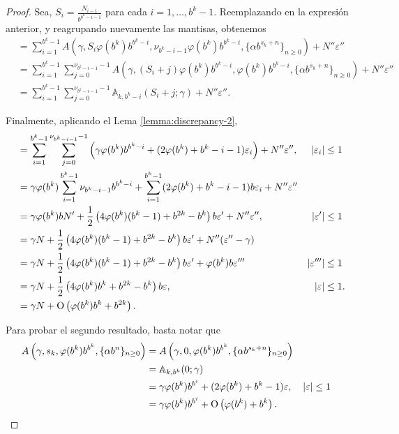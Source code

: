 \begin{proof}
Sea, $S_i = \frac{N_{i-1}}{b^{b^k - i - 1}}$ para cada $i = 1, \dots, b^k - 1$.
Reemplazando en la expresión anterior, y reagrupando nuevamente las mantisas,
obtenemos
\begin{align*}
	&= \sum_{i=1}^{b^k-1} A\left(\gamma, S_i\varphi(b^k)b^{b^k-i},
		\nu_{b^k-i-1}\varphi(b^k)b^{b^k-i}, \lbrace \alpha b^{s_k+n}
		\rbrace_{n\geq0} \right) + N''\varepsilon'' \\
	&= \sum_{i=1}^{b^k-1} \sum_{j=0}^{\nu_{b^k-i-1}-1} A\left(\gamma,
		(S_i + j)\varphi(b^k)b^{b^k-i}, \varphi(b^k)b^{b^k-i},
		\lbrace \alpha b^{s_k+n} \rbrace_{n\geq0} \right) + N''\varepsilon'' \\
	&= \sum_{i=1}^{b^k-1} \sum_{j=0}^{\nu_{b^k-i-1}-1}
		\mathbb{A}_{k,b^k-i}(S_i+j; \gamma) + N''\varepsilon''.
\end{align*}

Finalmente, aplicando el Lema \ref{lemma:discrepancy-2},
\begin{align*}
&= \sum_{i=1}^{b^k-1} \sum_{j=0}^{\nu_{b^k-i-1}-1} \left(
	\gamma\varphi(b^k)b^{b^k-i} + (2\varphi(b^k) + b^k - i - 1)\varepsilon_i
	\right) + N''\varepsilon'',
	& \vert \varepsilon_i \vert & \leq 1 \\
&= \gamma\varphi(b^k) \sum_{i=1}^{b^k-1} \nu_{b^k-i-1}b^{b^k-i} +
	\sum_{i=1}^{b^k-1} (2\varphi(b^k) + b^k - i - 1)b\varepsilon_i
	+ N''\varepsilon'' \\
&= \gamma\varphi(b^k)b N' + \frac{1}{2}\left(4\varphi(b^k)(b^k-1)
	+ b^{2k} - b^k \right)b\varepsilon' + N''\varepsilon'',
	& \vert \varepsilon' \vert & \leq 1 \\
&= \gamma N + \frac{1}{2}\left(4\varphi(b^k)(b^k-1)
	+ b^{2k} - b^k \right)b\varepsilon' + N''(\varepsilon'' - \gamma) \\
&= \gamma N + \frac{1}{2}\left(4\varphi(b^k)(b^k-1)
	+ b^{2k} - b^k \right)b\varepsilon' + \varphi(b^k)b\varepsilon'''
	& \vert \varepsilon''' \vert & \leq 1 \\
&= \gamma N + \frac{1}{2}\left(4\varphi(b^k)b^k
	+ b^{2k} - b^k \right)b\varepsilon,
	& \vert \varepsilon \vert & \leq 1. \\
&= \gamma N + \operatorname{O} \left(\varphi(b^k)b^{k} + b^{2k}\right).
\end{align*}

Para probar el segundo resultado, basta notar que
\begin{align*}
A\left(\gamma, s_k, \varphi(b^k)b^{b^k}, \lbrace \alpha b^{n} \rbrace_{n\geq0} \right)
	&= A\left(\gamma, 0, \varphi(b^k)b^{b^k}, \lbrace \alpha b^{s_k+n} \rbrace_{n\geq0} \right) \\
	&= \mathbb{A}_{k,b^k}(0; \gamma) \\
	&= \gamma\varphi(b^k)b^{b^i} + (2\varphi(b^k) + b^k - 1)\varepsilon,
		& \vert\varepsilon\vert &\leq 1 \\
	&= \gamma\varphi(b^k)b^{b^i} + \operatorname{O}\left(\varphi(b^k) + b^k\right). && \qedhere
\end{align*}
\end{proof}


